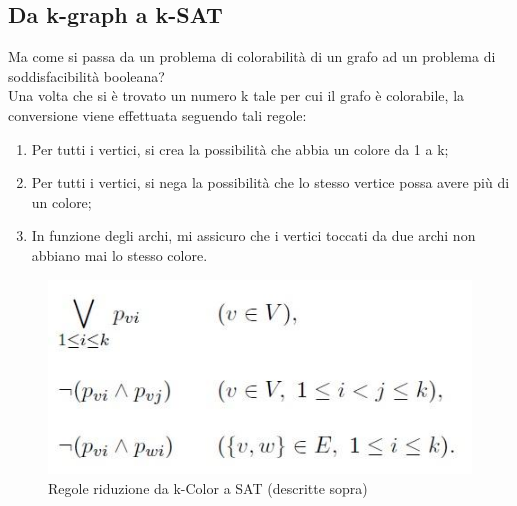 \documentclass[a4paper,11pt]{article} %
\begin{document}
\subsection{Da k-graph a k-SAT}
Ma come si passa da un problema di colorabilità di un grafo ad un problema di soddisfacibilità booleana?\\
Una volta che si è trovato un numero k tale per cui il grafo è colorabile, la conversione viene effettuata seguendo tali regole:
\begin{enumerate}
	\item Per tutti i vertici, si crea la possibilità che abbia un colore da 1 a k;
	\item Per tutti i vertici, si nega la possibilità che lo stesso vertice possa avere più di un colore;
	\item In funzione degli archi, mi assicuro che i vertici toccati da due archi non abbiano mai lo stesso colore.
\end{enumerate}
\begin{figure}[h]
	\centering
    \includegraphics[scale=0.5]{kcolor_to_sat.jpg}
    \caption{Regole riduzione da k-Color a SAT (descritte sopra)}
\end{figure}

\pagebreak
\end{document}
